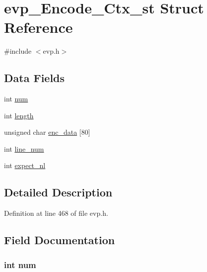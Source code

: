 \hypertarget{structevp___encode___ctx__st}{}\section{evp\+\_\+\+Encode\+\_\+\+Ctx\+\_\+st Struct Reference}
\label{structevp___encode___ctx__st}


{\ttfamily \#include $<$evp.\+h$>$}

\subsection*{Data Fields}
\begin{DoxyCompactItemize}
\item 
int \hyperlink{structevp___encode___ctx__st_a86cf672daa4e0ad11ad10efc894d19c8}{num}
\item 
int \hyperlink{structevp___encode___ctx__st_a9f59b34b1f25fe00023291b678246bcc}{length}
\item 
unsigned char \hyperlink{structevp___encode___ctx__st_a6d355b4e7185f1a0b47f90e4fab3f2a9}{enc\+\_\+data} \mbox{[}80\mbox{]}
\item 
int \hyperlink{structevp___encode___ctx__st_a7661b5d028be7f8997cef563e3890fd9}{line\+\_\+num}
\item 
int \hyperlink{structevp___encode___ctx__st_aa51eb2d2ae11aaafb2820a012f1ce98b}{expect\+\_\+nl}
\end{DoxyCompactItemize}


\subsection{Detailed Description}


Definition at line 468 of file evp.\+h.



\subsection{Field Documentation}
\subsubsection[{\texorpdfstring{num}{num}}]{\setlength{\rightskip}{0pt plus 5cm}int num}\hypertarget{structevp___encode___ctx__st_a86cf672daa4e0ad11ad10efc894d19c8}{}\label{structevp___encode___ctx__st_a86cf672daa4e0ad11ad10efc894d19c8}


